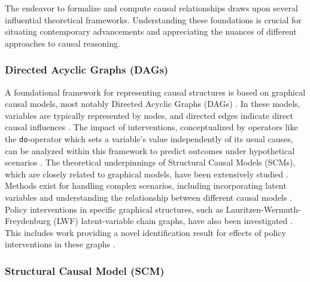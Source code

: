 {The endeavor to formalize and compute causal relationships draws upon several influential theoretical frameworks. Understanding these foundations is crucial for situating contemporary advancements and appreciating the nuances of different approaches to causal reasoning.

\subsubsection{Directed Acyclic Graphs (DAGs)}

A foundational framework for representing causal structures is based on graphical causal models, most notably Directed Acyclic Graphs (DAGs) \cite{verma1986causal, pearl1988probabilistic, Glymour2019Review, koller2009probabilistic}. In these models, variables are typically represented by nodes, and directed edges indicate direct causal influences \cite{pearl1988probabilistic}. The impact of interventions, conceptualized by operators like the \texttt{do}-operator which sets a variable's value independently of its usual causes, can be analyzed within this framework to predict outcomes under hypothetical scenarios \cite{pearl1988probabilistic, Pearl2009Causality}. The theoretical underpinnings of Structural Causal Models (SCMs), which are closely related to graphical models, have been extensively studied \cite{pearl2000causality, Peters2017Elements, bareinboim2020causal, janzing2016algorithmic, Peters2022Causal}. Methods exist for handling complex scenarios, including incorporating latent variables \cite{Mohan2021Graphical, richardson2003causal} and understanding the relationship between different causal models \cite{Verma1990Equivalence, pearl2018theoretical}. Policy interventions in specific graphical structures, such as Lauritzen-Wermuth-Freydenburg (LWF) latent-variable chain graphs, have also been investigated \cite{sherman2020general}. This includes work providing a novel identification result for effects of policy interventions in these graphs \cite{sherman2020general}.

\subsubsection{Structural Causal Model (SCM)}

}
